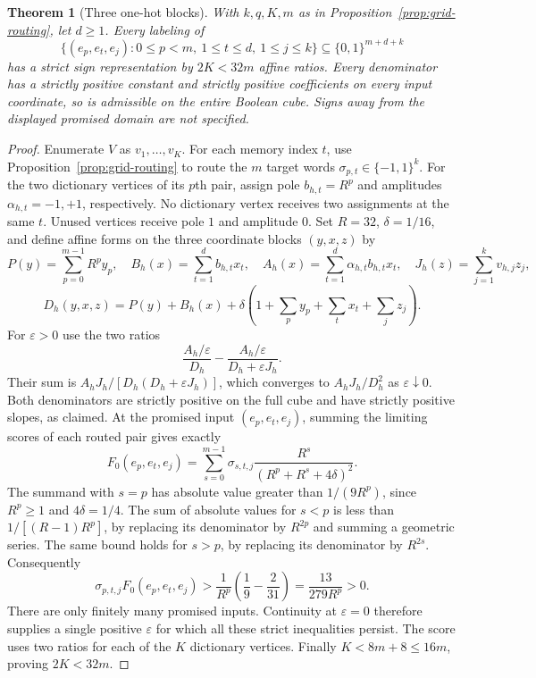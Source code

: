 \documentclass[11pt]{article}
\newtheorem{theorem}{Theorem}
\begin{document}
\begin{theorem}[Three one-hot blocks]\label{thm:grid-compiler}
With $k,q,K,m$ as in Proposition~\ref{prop:grid-routing}, let $d\geq1$.
Every labeling of
\[
 \{(e_p,e_t,e_j):0\leq p<m,\ 1\leq t\leq d,\ 1\leq j\leq k\}
 \subseteq\{0,1\}^{m+d+k}
\]
has a strict sign representation by $2K<32m$ affine ratios.
Every denominator has a strictly positive constant and strictly
positive coefficients on every input coordinate, so is admissible
on the entire Boolean cube. Signs away from the displayed promised
domain are not specified.
\end{theorem}

\begin{proof}
Enumerate $V$ as $v_1,\ldots,v_K$. For each memory index $t$,
use Proposition~\ref{prop:grid-routing} to route the $m$ target
words $\sigma_{p,t}\in\{-1,1\}^k$. For the two dictionary vertices
of its $p$th pair, assign pole $b_{h,t}=R^p$ and amplitudes
$\alpha_{h,t}=-1,+1$, respectively. No dictionary vertex receives
two assignments at the same $t$. Unused vertices receive pole $1$
and amplitude $0$. Set $R=32$, $\delta=1/16$, and define affine forms
on the three coordinate blocks $(y,x,z)$ by
\[
 P(y)=\sum_{p=0}^{m-1}R^p y_p,\quad
 B_h(x)=\sum_{t=1}^d b_{h,t}x_t,\quad
 A_h(x)=\sum_{t=1}^d\alpha_{h,t}b_{h,t}x_t,\quad
 J_h(z)=\sum_{j=1}^k v_{h,j}z_j,
\]
\[
 D_h(y,x,z)=P(y)+B_h(x)+
 \delta\left(1+\sum_p y_p+\sum_t x_t+\sum_jz_j\right).
\]
For $\varepsilon>0$ use the two ratios
\[
 \frac{A_h/\varepsilon}{D_h}
 -\frac{A_h/\varepsilon}{D_h+\varepsilon J_h}.
\]
Their sum is $A_hJ_h/[D_h(D_h+\varepsilon J_h)]$, which converges
to $A_hJ_h/D_h^2$ as $\varepsilon\downarrow0$. Both denominators
are strictly positive on the full cube and have strictly positive
slopes, as claimed. At the promised input $(e_p,e_t,e_j)$,
summing the limiting scores of each routed pair gives exactly
\[
 F_0(e_p,e_t,e_j)=
 \sum_{s=0}^{m-1}\sigma_{s,t,j}
       \frac{R^s}{(R^p+R^s+4\delta)^2}.
\]
The summand with $s=p$ has absolute value greater than
$1/(9R^p)$, since $R^p\geq1$ and $4\delta=1/4$.
The sum of absolute values for $s<p$ is less than
$1/[(R-1)R^p]$, by replacing its denominator by $R^{2p}$
and summing a geometric series. The same bound holds for $s>p$,
by replacing its denominator by $R^{2s}$. Consequently
\[
 \sigma_{p,t,j}F_0(e_p,e_t,e_j)
 >\frac1{R^p}\left(\frac19-\frac2{31}\right)
 =\frac{13}{279R^p}>0.
\]
There are only finitely many promised inputs. Continuity at
$\varepsilon=0$ therefore supplies a single positive $\varepsilon$
for which all these strict inequalities persist. The score uses
two ratios for each of the $K$ dictionary vertices. Finally
$K<8m+8\leq16m$, proving $2K<32m$.
\end{proof}
\end{document}
